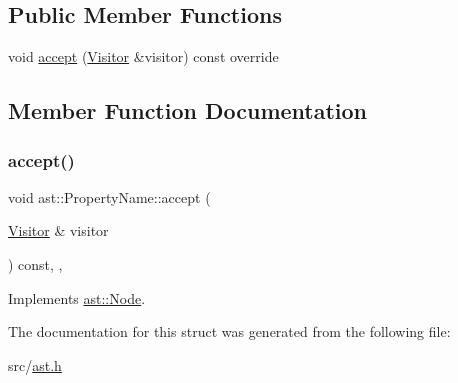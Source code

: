 \subsection*{Public Member Functions}
\begin{DoxyCompactItemize}
\item 
void \hyperlink{structast_1_1_property_name_afa2854c00d43a15171cf5911ac4cd8bf}{accept} (\hyperlink{structast_1_1_visitor}{Visitor} \&visitor) const override
\end{DoxyCompactItemize}


\subsection{Member Function Documentation}
\mbox{\label{structast_1_1_property_name_afa2854c00d43a15171cf5911ac4cd8bf}} 
\subsubsection{\texorpdfstring{accept()}{accept()}}
{\footnotesize\ttfamily void ast\+::\+Property\+Name\+::accept (\begin{DoxyParamCaption}\item[{\hyperlink{structast_1_1_visitor}{Visitor} \&}]{visitor }\end{DoxyParamCaption}) const\hspace{0.3cm}{\ttfamily [inline]}, {\ttfamily [override]}, {\ttfamily [virtual]}}



Implements \hyperlink{structast_1_1_node_abc089ee6caaf06a4445ebdd8391fdebc}{ast\+::\+Node}.



The documentation for this struct was generated from the following file\+:\begin{DoxyCompactItemize}
\item 
src/\hyperlink{ast_8h}{ast.\+h}\end{DoxyCompactItemize}
